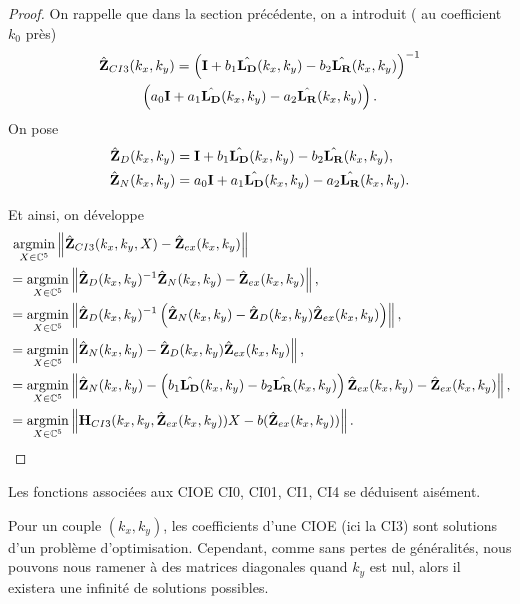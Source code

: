     \begin{proof}
      On rappelle que dans la section précédente, on a introduit ( au coefficient \(k_0\) près)
      \begin{multline*}
        \hat{\mathbf{Z}}_{CI3}(k_x,k_y) = \left(\mathbf{I} + b_1 \hat{\mathbf{L_D}}(k_x,k_y) - b_2 \hat{\mathbf{L_R}}(k_x,k_y) \right)^{-1}\\\left(a_0 \mathbf{I} + a_1 {\hat{\mathbf{L_D}}(k_x,k_y)} - a_2 {\hat{\mathbf{L_R}}(k_x,k_y)}\right).
      \end{multline*}
      On pose
      \begin{align*}
        \hat{\mathbf{Z}}_D(k_x,k_y) &= \mathbf{I} + b_1 \hat{\mathbf{L_D}}(k_x,k_y) - b_2 \hat{\mathbf{L_R}}(k_x,k_y),
        \\
        \hat{\mathbf{Z}}_N(k_x,k_y) &= a_0 \mathbf{I} + a_1 {\hat{\mathbf{L_D}}(k_x,k_y)} - a_2 {\hat{\mathbf{L_R}}(k_x,k_y)}.
      \end{align*}

      Et ainsi, on développe
      \begin{align*}
      &{}~ {\underset{X\in\mathbb C^5}{\operatorname{argmin}}} \left\lVert\hat{\mathbf{Z}}_{CI3}(k_x,k_y,X) - \hat{\mathbf{Z}}_{ex}(k_x,k_y)\right\rVert
      \\
      & = {\underset{X\in\mathbb C^5}{\operatorname{argmin}}} \left\lVert\hat{\mathbf{Z}}_D(k_x,k_y)^{-1}\hat{\mathbf{Z}}_N(k_x,k_y) - \hat{\mathbf{Z}}_{ex}(k_x,k_y) \right\rVert,
      \\
      &= {\underset{X\in\mathbb C^5}{\operatorname{argmin}}} \left\lVert\hat{\mathbf{Z}}_D(k_x,k_y)^{-1}\left(\hat{\mathbf{Z}}_N(k_x,k_y) - \hat{\mathbf{Z}}_D(k_x,k_y)\hat{\mathbf{Z}}_{ex}(k_x,k_y)\right) \right\rVert,
      \\
      &= {\underset{X\in\mathbb C^5}{\operatorname{argmin}}} \left\lVert\hat{\mathbf{Z}}_N(k_x,k_y) - \hat{\mathbf{Z}}_D(k_x,k_y)\hat{\mathbf{Z}}_{ex}(k_x,k_y)\right\rVert,
      \\
      &= {\underset{X\in\mathbb C^5}{\operatorname{argmin}}} \left\lVert\hat{\mathbf{Z}}_N(k_x,k_y) - \left(b_1 \hat{\mathbf{L_D}}(k_x,k_y) - b_2 \hat{\mathbf{L_R}}(k_x,k_y)\right)\hat{\mathbf{Z}}_{ex}(k_x,k_y) - \hat{\mathbf{Z}}_{ex}(k_x,k_y) \right\rVert,
      \\
      &= {\underset{X\in\mathbb C^5}{\operatorname{argmin}}} \left\lVert\mathbf{H}_{CI3}(k_x,k_y,\hat{\mathbf{Z}}_{ex}(k_x,k_y))X - b(\hat{\mathbf{Z}}_{ex}(k_x,k_y))\right\rVert.
      \end{align*}
    \end{proof}

    Les fonctions associées aux CIOE CI0, CI01, CI1, CI4 se déduisent aisément.

    Pour un couple \((k_x,k_y)\), les coefficients d'une CIOE (ici la CI3) sont solutions d'un problème d'optimisation.
    Cependant, comme sans pertes de généralités, nous pouvons nous ramener à des matrices diagonales quand \(k_y\) est nul, alors il existera une infinité de solutions possibles.
 
